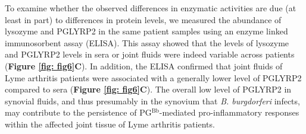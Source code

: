 \documentclass[twoside, watermark]{zHenriquesLab-StyleBioRxiv}
\newcommand{\pgbb}{PG$^\text{Bb}$}
\begin{document}
\vspace{1mm}
To examine whether the observed differences in enzymatic activities are due (at least in part) to differences in protein levels, we measured the abundance of lysozyme and PGLYRP2 in the same patient samples using an enzyme linked immunosorbent assay (ELISA). This assay showed that the levels of lysozyme and PGLYRP2 levels in sera or joint fluids were indeed variable across patients (\textbf{Figure \ref{fig: fig6}C}). In addition, the ELISA confirmed that joint fluids of Lyme arthritis patients were associated with a generally lower level of PGLYRP2 compared to sera (\textbf{Figure \ref{fig: fig6}C}). The overall low level of PGLYRP2 in synovial fluids, and thus presumably in the synovium that \textit{B. burgdorferi} infects, may contribute to the persistence of \pgbb-mediated pro-inflammatory responses within the affected joint tissue of Lyme arthritis patients.
\end{document}
